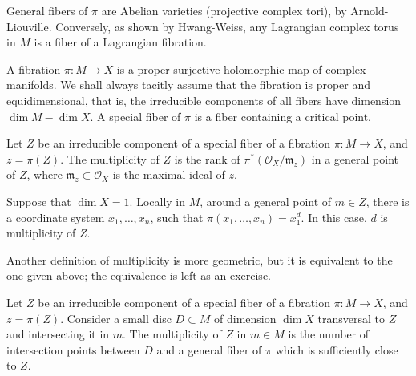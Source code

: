 \begin{remark}
\label{remark-general-fibers-abelian}
General fibers of \(\pi\) are Abelian
varieties (projective complex tori), by
Arnold-Liouville. Conversely, as shown by
Hwang-Weiss, any Lagrangian complex torus in
\(M\) is a fiber of a Lagrangian fibration.
\end{remark}

\begin{remark}
\label{remark-fibration}
A fibration \(\pi : M \to X\) is a proper
surjective holomorphic map of complex
manifolds. We shall always tacitly assume
that the fibration is proper and
equidimensional, that is, the irreducible
components of all fibers have dimension
\(\dim M - \dim X\). A special fiber of
\(\pi\) is a fiber containing a critical
point.
\end{remark}

\begin{definition}
\label{definition-multiplicity-special-fiber}
Let \(Z\) be an irreducible component of a
special fiber of a fibration
\(\pi : M \to X\), and \(z=\pi(Z)\). The
multiplicity of \(Z\) is the rank of
\(\pi^*(\mathcal{O}_X/\mathfrak{m}_z)\) in a
general point of \(Z\), where
\(\mathfrak{m}_z \subset \mathcal{O}_X\) is
the maximal ideal of \(z\).
\end{definition}

\begin{remark}
\label{remark-multiplicity-one-dimensional}
Suppose that \(\dim X=1\). Locally in \(M\),
around a general point of \(m \in Z\), there
is a coordinate system \(x_1,\ldots,x_n\),
such that \(\pi(x_1,\ldots,x_n)=x_1^d\).
In this case, \(d\) is multiplicity of
\(Z\).
\end{remark}

\begin{remark}
\label{remark-equivalent-definition}
Another definition of multiplicity is more
geometric, but it is equivalent to the one
given above; the equivalence is left as an
exercise.
\end{remark}

\begin{definition}
\label{definition-multiplicity-transversal-disk}
Let \(Z\) be an irreducible component of a
special fiber of a fibration
\(\pi : M \to X\), and \(z=\pi(Z)\).
Consider a small disc \(D \subset M\) of
dimension \(\dim X\) transversal to \(Z\)
and intersecting it in \(m\). The
multiplicity of \(Z\) in \(m \in M\) is the
number of intersection points between \(D\)
and a general fiber of \(\pi\) which is
sufficiently close to \(Z\).
\end{definition}

